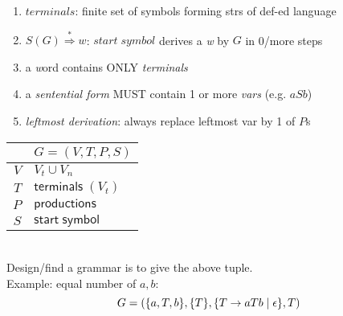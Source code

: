 {\footnotesize
\begin{minipage}{0.45\linewidth}
\begin{enumerate}
\item \(terminals\): finite set of symbols forming strs of def-ed language
\item \(S(G) \overset{*}{\Rightarrow} w\): \(start\; symbol\) derives a \emph{w} by \(G\) in 0/more steps
\item a \emph{w}ord contains ONLY \emph{terminals}
\item a \emph{sentential form} MUST contain 1 or more \emph{vars} (e.g. \(aSb\))
\item \emph{leftmost derivation}: always replace leftmost var by 1 of \(P\)s
\end{enumerate}
\end{minipage}
\begin{minipage}{0.5\linewidth}
  \centering
  \begin{tabular}{r|l}
    & $G = (V,T,P,S)$  \\
    \hline
    $V$ & $V_{t} \cup V_{n}$ \\
    $T$ & $\mathsf{terminals} \; (V_{t})$\\
    $P$ & $\mathsf{productions}$ \\
    $S$ & $\mathsf{start \; symbol}$
\end{tabular}\\
Design/find a grammar is to give the above tuple.\\
Example: equal number of \(a, b\):
\[
  G = (\{a,T,b\},\{T\},\{T \rightarrow aTb \;|\; \epsilon\},T)
\]

\end{minipage}
}
